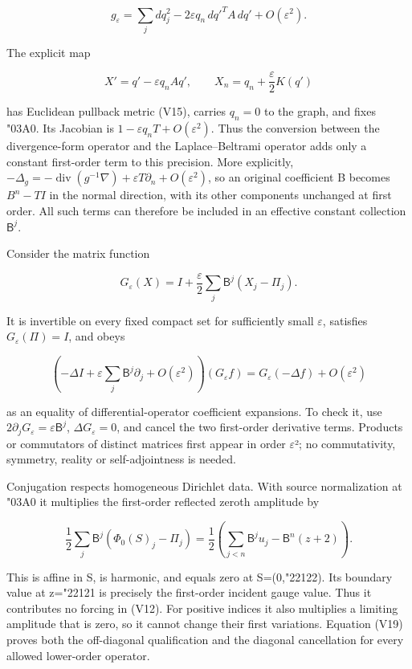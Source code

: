 \documentclass[
  11pt,
]{article}
\begin{document}
\[
 g_\varepsilon=\sum_j dq_j^2-2\varepsilon q_n\,dq'^T A\,dq'
                  +O(\varepsilon^2).
 \tag{V15}
\]

The explicit map

\[
 X'=q'-\varepsilon q_nAq',\qquad
 X_n=q_n+\frac{\varepsilon}{2}K(q')
 \tag{V16}
\]

has Euclidean pullback metric (V15), carries \ensuremath{q_n=0} to the graph, and
fixes {\ReaderSymbols\char"03A0}. Its Jacobian is \(1-\varepsilon q_nT+O(\varepsilon^2)\). Thus
the conversion between the divergence-form operator and the
Laplace--Beltrami operator adds only a constant first-order term to this
precision. More explicitly,
\(-\Delta_g=-\operatorname{div}(g^{-1}\nabla)+\varepsilon T\partial_n+O(\varepsilon^2)\),
so an original coefficient B becomes \(B^n-TI\) in the normal direction,
with its other components unchanged at first order. All such terms can
therefore be included in an effective constant collection
\(\mathsf B^j\).

Consider the matrix function

\[
 G_\varepsilon(X)=I+\frac{\varepsilon}{2}
                      \sum_j\mathsf B^j(X_j-\Pi_j).
 \tag{V17}
\]

It is invertible on every fixed compact set for sufficiently small \ensuremath{\varepsilon},
satisfies \(G_\varepsilon(\Pi)=I\), and obeys

\[
 \left(-\Delta I+\varepsilon\sum_j\mathsf B^j\partial_j
            +O(\varepsilon^2)\right)(G_\varepsilon f)
 =G_\varepsilon(-\Delta f)+O(\varepsilon^2)
 \tag{V18}
\]

as an equality of differential-operator coefficient expansions. To check
it, use \(2\partial_jG_\varepsilon=\varepsilon\mathsf B^j\),
\(\Delta G_\varepsilon=0\), and cancel the two first-order derivative
terms. Products or commutators of distinct matrices first appear in
order \ensuremath{\varepsilon}²; no commutativity, symmetry, reality or self-adjointness is
needed.

Conjugation respects homogeneous Dirichlet data. With source
normalization at {\ReaderSymbols\char"03A0} it multiplies the first-order reflected zeroth
amplitude by

\[
 \frac12\sum_j\mathsf B^j(\Phi_0(S)_j-\Pi_j)
 =\frac12\left(\sum_{j<n}\mathsf B^j u_j-\mathsf B^n(z+2)\right).
 \tag{V19}
\]

This is affine in S, is harmonic, and equals zero at S=(0,{\ReaderSymbols\char"2212}2). Its
boundary value at z={\ReaderSymbols\char"2212}1 is precisely the first-order incident gauge
value. Thus it contributes no forcing in (V12). For positive indices it
also multiplies a limiting amplitude that is zero, so it cannot change
their first variations. Equation (V19) proves both the off-diagonal
qualification and the diagonal cancellation for every allowed
lower-order operator.
\end{document}
